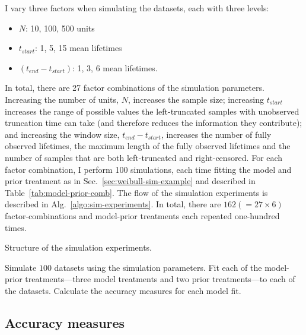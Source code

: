 I vary three factors when simulating the datasets, each with three levels:
\begin{itemize}
    \item[] $N$: 10, 100, 500 units
    \item[] $t_{start}$: 1, 5, 15 mean lifetimes
    \item[] $(t_{end} - t_{start})$: 1, 3, 6 mean lifetimes.
\end{itemize}
In total, there are 27 factor combinations of the simulation parameters. Increasing the number of units, $N$, increases the sample size; increasing $t_{start}$ increases the range of possible values the left-truncated samples with unobserved truncation time can take (and therefore reduces the information they contribute); and increasing the window size, $t_{end} - t_{start}$, increases the number of fully observed lifetimes, the maximum length of the fully observed lifetimes and the number of samples that are both left-truncated and right-censored. For each factor combination, I perform 100 simulations, each time fitting the model and prior treatment as in Sec.~\ref{sec:weibull-sim-example} and described in Table~\ref{tab:model-prior-comb}. The flow of the simulation experiments is described in Alg.~\ref{algo:sim-experiments}. In total, there are $162 (=27 \times 6)$ factor-combinations and model-prior treatments each repeated one-hundred times.

\begin{algorithm}
	\caption{Structure of the simulation experiments.}
  \label{algo:sim-experiments}
	\begin{algorithmic}[1]
    \State Simulate $100$ datasets using the simulation parameters.
    \State Fit each of the model-prior treatments---three model treatments and two prior treatments---to each of the datasets.
    \State Calculate the accuracy measures for each model fit.
    \EndFor
	\end{algorithmic} 
\end{algorithm} 

\subsection{Accuracy measures} \label{subsec:accuracy-measures}

